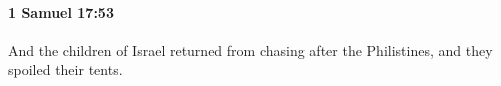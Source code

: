 
		\paragraph{1 Samuel 17:53} %
			\label{1SAMUEL-17-53}

			And the children of Israel returned from chasing after the Philistines, and they spoiled their tents.


